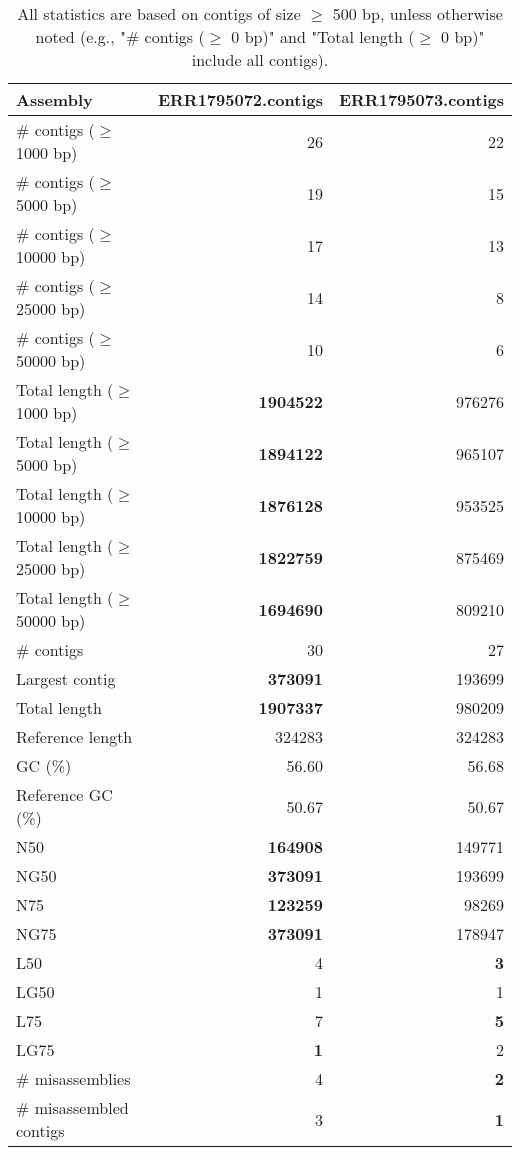 \documentclass[12pt,a4paper]{article}
\begin{document}
\begin{table}[ht]
\begin{center}
\caption{All statistics are based on contigs of size $\geq$ 500 bp, unless otherwise noted (e.g., "\# contigs ($\geq$ 0 bp)" and "Total length ($\geq$ 0 bp)" include all contigs).}
\begin{tabular}{|l*{2}{|r}|}
\hline
Assembly & ERR1795072.contigs & ERR1795073.contigs \\ \hline
\# contigs ($\geq$ 1000 bp) & 26 & 22 \\ \hline
\# contigs ($\geq$ 5000 bp) & 19 & 15 \\ \hline
\# contigs ($\geq$ 10000 bp) & 17 & 13 \\ \hline
\# contigs ($\geq$ 25000 bp) & 14 & 8 \\ \hline
\# contigs ($\geq$ 50000 bp) & 10 & 6 \\ \hline
Total length ($\geq$ 1000 bp) & {\bf 1904522} & 976276 \\ \hline
Total length ($\geq$ 5000 bp) & {\bf 1894122} & 965107 \\ \hline
Total length ($\geq$ 10000 bp) & {\bf 1876128} & 953525 \\ \hline
Total length ($\geq$ 25000 bp) & {\bf 1822759} & 875469 \\ \hline
Total length ($\geq$ 50000 bp) & {\bf 1694690} & 809210 \\ \hline
\# contigs & 30 & 27 \\ \hline
Largest contig & {\bf 373091} & 193699 \\ \hline
Total length & {\bf 1907337} & 980209 \\ \hline
Reference length & 324283 & 324283 \\ \hline
GC (\%) & 56.60 & 56.68 \\ \hline
Reference GC (\%) & 50.67 & 50.67 \\ \hline
N50 & {\bf 164908} & 149771 \\ \hline
NG50 & {\bf 373091} & 193699 \\ \hline
N75 & {\bf 123259} & 98269 \\ \hline
NG75 & {\bf 373091} & 178947 \\ \hline
L50 & 4 & {\bf 3} \\ \hline
LG50 & 1 & 1 \\ \hline
L75 & 7 & {\bf 5} \\ \hline
LG75 & {\bf 1} & 2 \\ \hline
\# misassemblies & 4 & {\bf 2} \\ \hline
\# misassembled contigs & 3 & {\bf 1} \\ \hline

\end{tabular}
\end{center}
\end{table}
\end{document}

